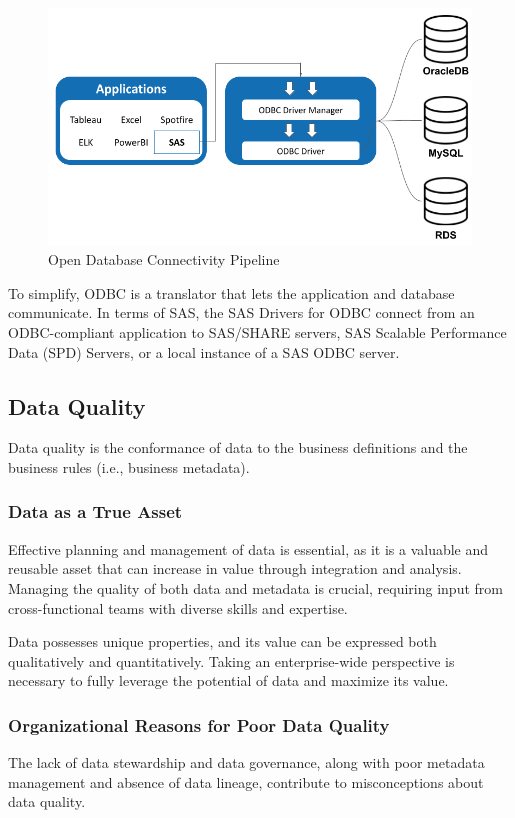 \begin{figure}[H]
    \centering
    \includegraphics[scale=0.75]{images/ODBC.png}
    \caption{Open Database Connectivity Pipeline}
    \label{ODBC}
\end{figure}

To simplify, ODBC is a translator that lets the application and database communicate. In terms of SAS, the SAS Drivers for ODBC connect from an ODBC-compliant application to SAS/SHARE servers, SAS Scalable Performance Data (SPD) Servers, or a local instance of a SAS ODBC server.

\subsection{Data Quality}
Data quality is the conformance of data to the business definitions and the business rules (i.e., business metadata).

\subsubsection{Data as a True Asset}
Effective planning and management of data is essential, as it is a valuable and reusable asset that can increase in value through integration and analysis. Managing the quality of both data and metadata is crucial, requiring input from cross-functional teams with diverse skills and expertise. 

Data possesses unique properties, and its value can be expressed both qualitatively and quantitatively. Taking an enterprise-wide perspective is necessary to fully leverage the potential of data and maximize its value.

\subsubsection{Organizational Reasons for Poor Data Quality}
The lack of data stewardship and data governance, along with poor metadata management and absence of data lineage, contribute to misconceptions about data quality. 

